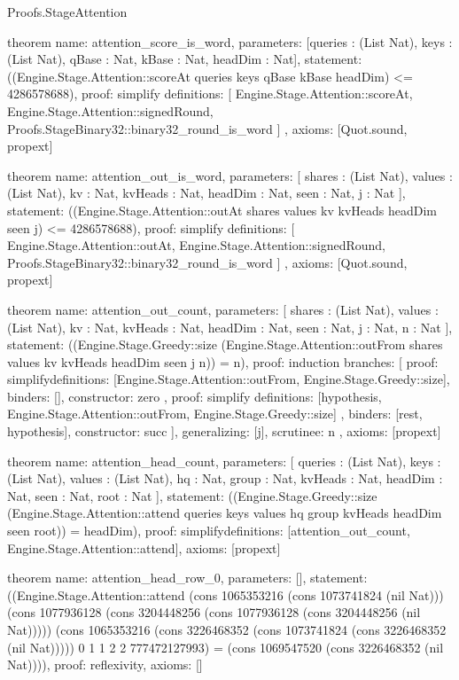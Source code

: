 \begin{lexlean}{Proofs.StageAttention}
\begin{semanticmodule}
theorem{
  name: attention_score_is_word,
  parameters: [queries : (List Nat), keys : (List Nat), qBase : Nat, kBase : Nat, headDim : Nat],
  statement: ((Engine.Stage.Attention::scoreAt queries keys qBase kBase headDim) <= 4286578688),
  proof: simplify{
    definitions: [
      Engine.Stage.Attention::scoreAt,
      Engine.Stage.Attention::signedRound,
      Proofs.StageBinary32::binary32_round_is_word
    ]
  },
  axioms: [Quot.sound, propext]
}

theorem{
  name: attention_out_is_word,
  parameters: [
    shares : (List Nat),
    values : (List Nat),
    kv : Nat,
    kvHeads : Nat,
    headDim : Nat,
    seen : Nat,
    j : Nat
  ],
  statement: ((Engine.Stage.Attention::outAt shares values kv kvHeads headDim seen j) <= 4286578688),
  proof: simplify{
    definitions: [
      Engine.Stage.Attention::outAt,
      Engine.Stage.Attention::signedRound,
      Proofs.StageBinary32::binary32_round_is_word
    ]
  },
  axioms: [Quot.sound, propext]
}

theorem{
  name: attention_out_count,
  parameters: [
    shares : (List Nat),
    values : (List Nat),
    kv : Nat,
    kvHeads : Nat,
    headDim : Nat,
    seen : Nat,
    j : Nat,
    n : Nat
  ],
  statement: ((Engine.Stage.Greedy::size (Engine.Stage.Attention::outFrom shares values kv kvHeads headDim seen j n)) = n),
  proof: induction{
    branches: [
      {
        proof: simplify{definitions: [Engine.Stage.Attention::outFrom, Engine.Stage.Greedy::size]},
        binders: [],
        constructor: zero
      },
      {
        proof: simplify{
          definitions: [hypothesis, Engine.Stage.Attention::outFrom, Engine.Stage.Greedy::size]
        },
        binders: [rest, hypothesis],
        constructor: succ
      }
    ],
    generalizing: [j],
    scrutinee: n
  },
  axioms: [propext]
}

theorem{
  name: attention_head_count,
  parameters: [
    queries : (List Nat),
    keys : (List Nat),
    values : (List Nat),
    hq : Nat,
    group : Nat,
    kvHeads : Nat,
    headDim : Nat,
    seen : Nat,
    root : Nat
  ],
  statement: ((Engine.Stage.Greedy::size (Engine.Stage.Attention::attend queries keys values hq group kvHeads headDim seen root)) = headDim),
  proof: simplify{definitions: [attention_out_count, Engine.Stage.Attention::attend]},
  axioms: [propext]
}

theorem{
  name: attention_head_row_0,
  parameters: [],
  statement: ((Engine.Stage.Attention::attend (cons 1065353216 (cons 1073741824 (nil Nat))) (cons 1077936128 (cons 3204448256 (cons 1077936128 (cons 3204448256 (nil Nat))))) (cons 1065353216 (cons 3226468352 (cons 1073741824 (cons 3226468352 (nil Nat))))) 0 1 1 2 2 777472127993) = (cons 1069547520 (cons 3226468352 (nil Nat)))),
  proof: reflexivity{},
  axioms: []
}


\end{semanticmodule}
\end{lexlean}
